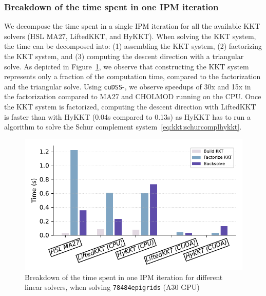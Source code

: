 \subsubsection{Breakdown of the time spent in one IPM iteration}
We decompose the time spent in a single
IPM iteration for all the available KKT solvers (HSL MA27, LiftedKKT, and HyKKT).
When solving the KKT system, the time can be decomposed into: (1) assembling the
KKT system, (2) factorizing the KKT system, and (3) computing the descent direction with a triangular solve.
As depicted in Figure~\ref{fig:timebreakdown}, we observe
that constructing the KKT system represents only a fraction of the computation time, compared
to the factorization and the triangular solve. Using {\tt cuDSS}-\ldlt, we observe speedups of
30x and 15x in the factorization compared to MA27 and CHOLMOD running on the CPU.
Once the KKT system is factorized, computing the descent direction with LiftedKKT is faster than with HyKKT
(0.04s compared to 0.13s) as HyKKT has to run a \CG algorithm to solve the Schur complement
system~\eqref{eq:kkt:schurcomplhykkt}.

\begin{figure}[!ht]
  \centering
  \includegraphics[width=.7\textwidth]{../figures/breakdown.pdf}
  \caption{Breakdown of the time spent in one IPM iteration
    for different linear solvers, when solving {\tt 78484epigrids} (A30 GPU)
  \label{fig:timebreakdown}}
\end{figure}




